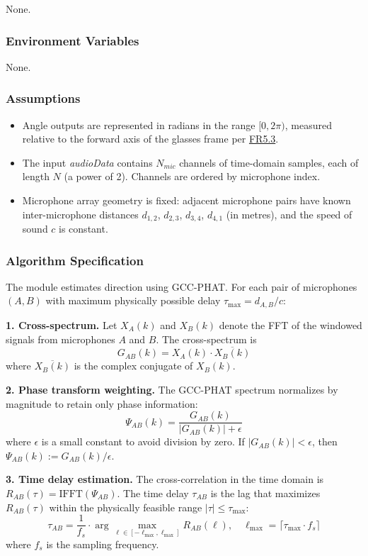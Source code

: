 \documentclass[12pt, titlepage]{article}
\begin{document}
None.

\subsubsection{Environment Variables}

None.

\subsubsection{Assumptions}

\begin{itemize}
  \item Angle outputs are represented in radians in the range $[0, 2\pi)$,
  measured relative to the forward axis of the glasses frame per
  \hyperref[SRS-FR5_3]{FR5.3}.
  \item The input \textit{audioData} contains $N_{mic}$ channels of time-domain
  samples, each of length $N$ (a power of 2). Channels are ordered by
  microphone index.
  \item Microphone array geometry is fixed: adjacent microphone pairs have
  known inter-microphone distances $d_{1,2}$, $d_{2,3}$, $d_{3,4}$, $d_{4,1}$
  (in metres), and the speed of sound $c$ is constant.
\end{itemize}

\subsubsection{Algorithm Specification}

The module estimates direction using GCC-PHAT. For each pair of microphones
$(A, B)$ with maximum physically possible delay $\tau_{\max} = d_{A,B} / c$:

\textbf{1. Cross-spectrum.} Let $X_A(k)$ and $X_B(k)$ denote the FFT of the
windowed signals from microphones $A$ and $B$. The cross-spectrum is
\[
  G_{AB}(k) = X_A(k) \cdot \overline{X_B(k)}
\]
where $\overline{X_B(k)}$ is the complex conjugate of $X_B(k)$.

\textbf{2. Phase transform weighting.} The GCC-PHAT spectrum normalizes by
magnitude to retain only phase information:
\[
  \Psi_{AB}(k) = \frac{G_{AB}(k)}{\left| G_{AB}(k) \right| + \epsilon}
\]
where $\epsilon$ is a small constant to avoid division by zero. If
$|G_{AB}(k)| < \epsilon$, then $\Psi_{AB}(k) := G_{AB}(k) / \epsilon$.

\textbf{3. Time delay estimation.} The cross-correlation in the time domain is
$R_{AB}(\tau) = \text{IFFT}(\Psi_{AB})$. The time delay $\tau_{AB}$ is the lag
that maximizes $R_{AB}(\tau)$ within the physically feasible range
$|\tau| \leq \tau_{\max}$:
\[
  \tau_{AB} = \frac{1}{f_s} \cdot \arg\max_{\ell \in [-\ell_{\max}, \ell_{\max}]}
  R_{AB}(\ell),\quad \ell_{\max} = \lceil \tau_{\max} \cdot f_s \rceil
\]
where $f_s$ is the sampling frequency.
\end{document}

